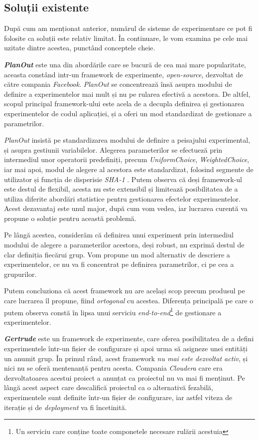 \subsection{Soluții existente}

După cum am menționat anterior, numărul de sisteme de experimentare ce pot fi folosite ca soluții este relativ limitat. În continuare, le vom examina pe cele mai uzitate dintre acestea, punctând conceptele cheie.

\textit{\textbf{PlanOut}} este una din abordările care se bucură de cea mai mare popularitate, aceasta constând intr-un framework de experimente, \textit{open-source}, dezvoltat de către compania \textit{Facebook}. \textit{PlanOut} se concentrează însă asupra modului de definire a experimentelor mai mult și nu pe rularea efectivă a acestora. De altfel, scopul principal framework-ului este acela de a decupla definirea și gestionarea experimentelor de codul aplicației, și a oferi un mod standardizat de gestionare a parametrilor. 

\textit{PlanOut} insistă pe standardizarea modului de definire a peisajului experimental, și asupra gestiunii variabilelor. Alegerea parameterilor se efectueză prin intermediul unor operatorii predefiniți, precum \textit{UniformChoice}, \textit{WeightedChoice}, iar mai apoi, modul de alegere al acestora este standardizat, folosind segmente de utilizator și funcția de disperisie \textit{SHA-1}  \cite{planout}. Putem observa că deși framework-ul este destul de flexibil, acesta nu este extensibil și limitează posibilitatea de a utiliza diferite abordări statistice pentru gestionarea efectelor experimentelor. Acest dezavantaj este unul major, după cum vom vedea, iar lucrarea curentă va propune o soluție pentru această problemă. 

Pe lângă acestea, considerăm că definirea unui experiment prin intermediul modului de alegere a parameterilor acestora, deși robust, nu exprimă destul de clar definiția fiecărui grup. Vom propune un mod alternativ de descriere a experimentelor, ce nu va fi concentrat pe definirea parametrilor, ci pe cea a grupurilor. 

Putem concluziona că acest framework nu are același scop precum produsul pe care lucrarea îl propune, fiind \textit{ortogonal} cu acestea. Diferența principală pe care o putem observa constă în lipsa unui serviciu \textit{end-to-end}\footnote{Un serviciu care conține toate componetele necesare rulării acestuia} de gestionare a experimentelor.

\textbf{\textit{Gertrude}} este un framework de experimente, care oferea posibilitatea de a defini experimentele într-un fișier de configurare și apoi urma să asigneze unei entități un anumit grup. În primul rând, acest framework \textit{nu mai este dezvoltat activ}, și nici nu se oferă mentenanță pentru acesta. Compania \textit{Cloudera} care era dezvoltatoarea acestui proiect a anunțat ca proiectul nu va mai fi menținut. Pe lângă acest aspect care descalifică proiectul ca o alternativă fezabilă, experimentele sunt definite într-un fișier de configurare, iar astfel viteza de iterație și de \textit{deployment} va fi încetinită. 

